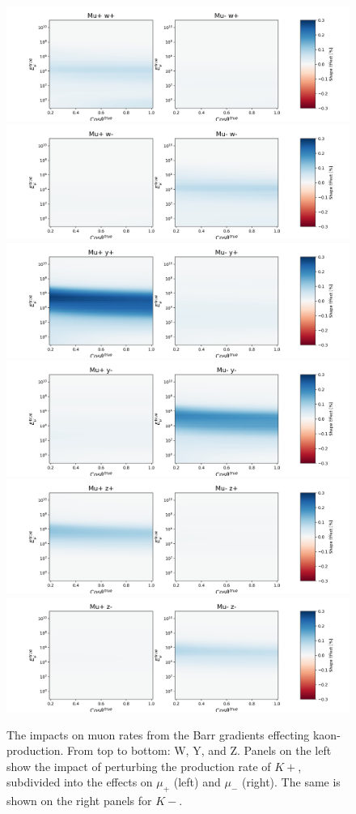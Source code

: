 \documentclass[main.tex]{subfiles}
\begin{document}
\begin{figure}
    \centering
    \includegraphics[width=0.45\linewidth]{./figures/muon/muon_barr_w+.png}%
    \includegraphics[width=0.45\linewidth]{./figures/muon/muon_barr_w-.png}
    \includegraphics[width=0.45\linewidth]{./figures/muon/muon_barr_y+.png}%
    \includegraphics[width=0.45\linewidth]{./figures/muon/muon_barr_y-.png}
    \includegraphics[width=0.45\linewidth]{./figures/muon/muon_barr_z+.png}%
    \includegraphics[width=0.45\linewidth]{./figures/muon/muon_barr_z-.png}
    \caption{The impacts on muon rates from the Barr gradients effecting kaon-production. From top to bottom: W, Y, and Z. Panels on the left show the impact of perturbing the production rate of $K+$, subdivided into the effects on $\mu_{+}$ (left) and $\mu_{-}$ (right). The same is shown on the right panels for $K-$.}
    \label{fig:barr_muon_kaon}
\end{figure}
\end{document}
